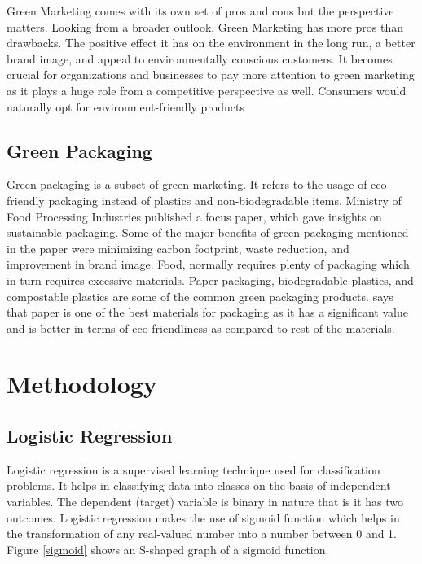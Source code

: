 \documentclass[a4paper,10pt]{article}
\begin{document}
Green Marketing comes with its own set of pros and cons but the perspective matters. Looking from a broader outlook, Green Marketing has more pros than drawbacks. The positive effect it has on the environment in the long run, a better brand image, and appeal to environmentally conscious customers. It becomes crucial for organizations and businesses to pay more attention to green marketing as it plays a huge role from a competitive perspective as well. Consumers would naturally opt for environment-friendly products \cite{Groening2018}


\subsection{Green Packaging}

Green packaging is a subset of green marketing. It refers to the usage of eco-friendly packaging instead of plastics and non-biodegradable items. Ministry of Food Processing Industries published a focus paper, \cite{MOFPI2023} which gave insights on sustainable packaging. Some of the major benefits of green packaging mentioned in the paper were minimizing carbon footprint, waste reduction, and improvement in brand image. Food, normally requires plenty of packaging which in turn requires excessive materials. Paper packaging, biodegradable plastics, and compostable plastics are some of the common green packaging products. \cite{Oloyede2021} says that paper is one of the best materials for packaging as it has a significant value and is better in terms of 
eco-friendliness as compared to rest of the materials.

\section{Methodology}

\subsection{Logistic Regression}

Logistic regression is a supervised learning technique used for classification problems. It helps in classifying data into classes on the basis of independent variables. The dependent (target) variable is binary in nature that is it has two outcomes. 
Logistic regression makes the use of sigmoid function which helps in the transformation of any real-valued number into a number between 0 and 1. Figure \ref{sigmoid} shows an S-shaped graph of a sigmoid function. 
\end{document}
